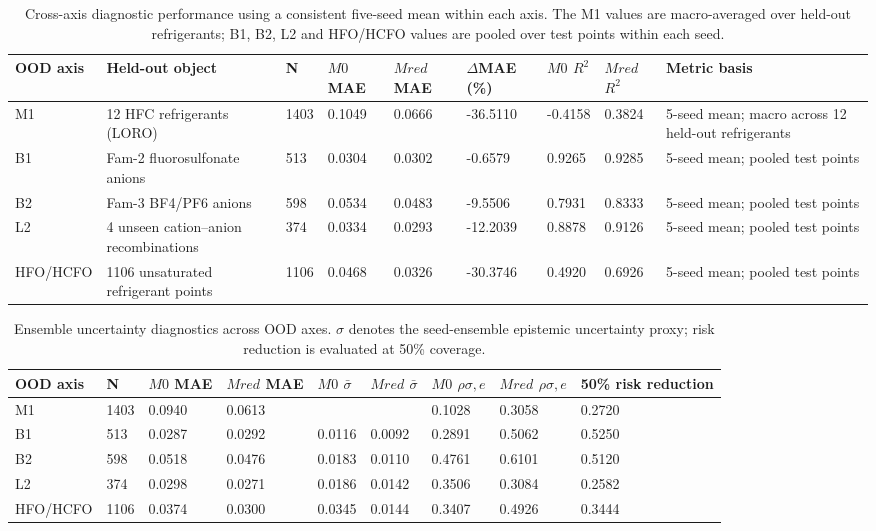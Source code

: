 \begin{table}[htbp]
\centering
\small
\caption{Cross-axis diagnostic performance using a consistent five-seed mean within each axis. The M1 values are macro-averaged over held-out refrigerants; B1, B2, L2 and HFO/HCFO values are pooled over test points within each seed.}
\label{tab:cross_axis_performance}
\begin{tabular}{lllllllll}
\toprule
OOD axis & Held-out object & N & $M 0$ MAE & $M {red}$ MAE & $\Delta$MAE (\%) & $M 0$ $R^2$ & $M {red}$ $R^2$ & Metric basis \\
\midrule
M1 & 12 HFC refrigerants (LORO) & 1403 & 0.1049 & 0.0666 & -36.5110 & -0.4158 & 0.3824 & 5-seed mean; macro across 12 held-out refrigerants \\
B1 & Fam-2 fluorosulfonate anions & 513 & 0.0304 & 0.0302 & -0.6579 & 0.9265 & 0.9285 & 5-seed mean; pooled test points \\
B2 & Fam-3 BF4/PF6 anions & 598 & 0.0534 & 0.0483 & -9.5506 & 0.7931 & 0.8333 & 5-seed mean; pooled test points \\
L2 & 4 unseen cation–anion recombinations & 374 & 0.0334 & 0.0293 & -12.2039 & 0.8878 & 0.9126 & 5-seed mean; pooled test points \\
HFO/HCFO & 1106 unsaturated refrigerant points & 1106 & 0.0468 & 0.0326 & -30.3746 & 0.4920 & 0.6926 & 5-seed mean; pooled test points \\
\bottomrule
\end{tabular}
\end{table}

\begin{table}[htbp]
\centering
\small
\caption{Ensemble uncertainty diagnostics across OOD axes. $\sigma$ denotes the seed-ensemble epistemic uncertainty proxy; risk reduction is evaluated at 50\% coverage.}
\label{tab:cross_axis_uq}
\begin{tabular}{lllllllll}
\toprule
OOD axis & N & $M 0$ MAE & $M {red}$ MAE & $M 0$ $\bar\sigma$ & $M {red}$ $\bar\sigma$ & $M 0$ $\rho {\sigma,e}$ & $M {red}$ $\rho {\sigma,e}$ & 50\% risk reduction \\
\midrule
M1 & 1403 & 0.0940 & 0.0613 &  &  & 0.1028 & 0.3058 & 0.2720 \\
B1 & 513 & 0.0287 & 0.0292 & 0.0116 & 0.0092 & 0.2891 & 0.5062 & 0.5250 \\
B2 & 598 & 0.0518 & 0.0476 & 0.0183 & 0.0110 & 0.4761 & 0.6101 & 0.5120 \\
L2 & 374 & 0.0298 & 0.0271 & 0.0186 & 0.0142 & 0.3506 & 0.3084 & 0.2582 \\
HFO/HCFO & 1106 & 0.0374 & 0.0300 & 0.0345 & 0.0144 & 0.3407 & 0.4926 & 0.3444 \\
\bottomrule
\end{tabular}
\end{table}

